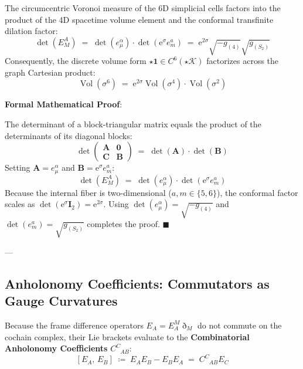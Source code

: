 \documentclass[
    12pt,
    a4paper,
    headings=normal,
    twoside=false,
    open=any,
    parskip=half
]{scrbook}
\DeclareMathOperator{\vol}{Vol}
\newcommand{\ethop}{\eth}
\newcommand{\eu}{\mathrm{e}}
\newenvironment{myproof}[1][]{%
  \par\vspace{6pt}\noindent\textbf{\sffamily\color{maincolor}Formal Mathematical Proof\ifstrempty{#1}{}{ (#1)}}:\par\nopagebreak
}{%
  \penalty50\hfill\ensuremath{\blacksquare}\par\vspace{6pt}
}
\begin{document}
\begin{phystheorem}\label{thm:ch2_determinant_factorization}
The circumcentric Voronoi measure of the 6D simplicial cells factors into the product of the 4D spacetime volume element and the conformal transfinite dilation factor:
\begin{equation}
\boxed{\det(E^A_M) \;=\; \det(e^\alpha_\mu) \cdot \det\left(\eu^\sigma e^a_m\right) \;=\; \eu^{2\sigma} \sqrt{-g_{(4)}} \sqrt{g_{(S_2)}}}
\label{eq:ch2_metric_determinant_master}
\end{equation}
Consequently, the discrete volume form $\star\mathbf{1} \in C^6(\star\mathcal{K})$ factorizes across the graph Cartesian product:
\begin{equation}
\vol(\sigma^6) \;=\; \eu^{2\sigma} \vol(\sigma^4) \cdot \vol(\sigma^2)
\end{equation}
\end{phystheorem}

\begin{myproof}
The determinant of a block-triangular matrix equals the product of the determinants of its diagonal blocks:
\begin{equation*}
\det\begin{pmatrix} \mathbf{A} & \mathbf{0} \\ \mathbf{C} & \mathbf{B} \end{pmatrix} \;=\; \det(\mathbf{A}) \cdot \det(\mathbf{B})
\end{equation*}
Setting $\mathbf{A} = e^\alpha_\mu$ and $\mathbf{B} = \eu^\sigma e^a_m$:
\begin{equation*}
\det(E^A_M) \;=\; \det(e^\alpha_\mu) \cdot \det\left(\eu^\sigma e^a_m\right)
\end{equation*}
Because the internal fiber is two-dimensional ($a, m \in \{5, 6\}$), the conformal factor scales as $\det(\eu^\sigma \mathbf{I}_2) = \eu^{2\sigma}$. Using $\det(e^\alpha_\mu) = \sqrt{-g_{(4)}}$ and $\det(e^a_m) = \sqrt{g_{(S_2)}}$ completes the proof.
\end{myproof}

---

\subsection{Anholonomy Coefficients: Commutators as Gauge Curvatures}

Because the frame difference operators $E_A = E_A^M \ethop_M$ do not commute on the cochain complex, their Lie brackets evaluate to the \textbf{Combinatorial Anholonomy Coefficients} $C^C_{\phantom{C}AB}$:
\begin{equation}
\left[ E_A, \, E_B \right] \;\coloneqq\; E_A E_B - E_B E_A \;=\; C^C_{\phantom{C}AB} E_C
\label{eq:ch2_anholonomy_commutator_def}
\end{equation}
\end{document}
